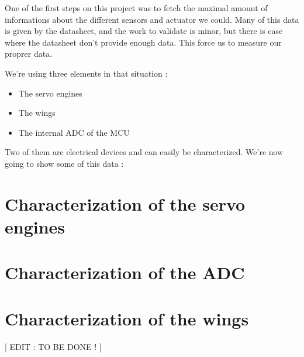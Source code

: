 One of the first steps on this project was to fetch the maximal amount of informations
about the different sensors and actuator we could.
Many of this data is given by the datasheet, and the work to validate is minor, but there 
is case where the datasheet don't provide enough data.
This force us to measure our proprer data.

We're using three elements in that situation : 
\begin{itemize}
    \item The servo engines
    \item The wings
    \item The internal ADC of the MCU
\end{itemize}

Two of them are electrical devices and can easily be characterized.
We're now going to show some of this data :

\section{Characterization of the servo engines}


\section{Characterization of the ADC}


\section{Characterization of the wings}

[ EDIT :  TO BE DONE ! ]

